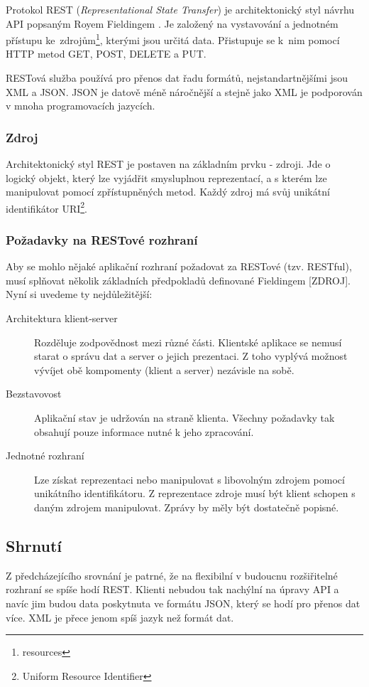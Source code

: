 \indent

Protokol REST (\textit{Representational State Transfer}) je architektonický styl návrhu API popsaným Royem Fieldingem \cite{fielding}.
Je založený na vystavování a jednotném přístupu ke~zdrojům\footnote{resources}, kterými jsou určitá data.
Přistupuje se k~nim pomocí HTTP metod GET, POST, DELETE a PUT.

\medskip

RESTová služba používá pro přenos dat řadu formátů, nejstandartnějšími jsou XML a JSON.
JSON je datově méně náročnější a stejně jako XML je podporován v mnoha programovacích jazycích.

\subsubsection*{Zdroj}

Architektonický styl REST je postaven na základním prvku - zdroji. Jde o logický objekt,
který lze vyjádřit smysluplnou reprezentací, a s kterém lze manipulovat pomocí zpřístupněných metod.
Každý zdroj má svůj unikátní identifikátor URI\footnote{Uniform Resource Identifier}.

\subsubsection*{Požadavky na RESTové rozhraní}

Aby se mohlo nějaké aplikační rozhraní požadovat za RESTové (tzv. RESTful),
musí splňovat několik základních předpokladů definované Fieldingem [ZDROJ].
Nyní si uvedeme ty nejdůležitější:

\begin{description}
    \item[Architektura klient-server]
    Rozděluje zodpovědnost mezi různé části. Klientské aplikace se nemusí starat o správu dat a server o jejich prezentaci.
    Z toho vyplývá možnost vývíjet obě kompomenty (klient a server) nezávisle na sobě.
    \item[Bezstavovost]
    Aplikační stav je udržován na straně klienta. Všechny požadavky tak obsahují pouze informace nutné k jeho zpracování.  
    \item[Jednotné rozhraní]
    Lze získat reprezentaci nebo manipulovat s libovolným zdrojem pomocí unikátního identifikátoru.
    Z reprezentace zdroje musí být klient schopen s daným zdrojem manipulovat. Zprávy by měly být dostatečně popisné.
\end{description}


\subsection{Shrnutí}

Z předcházejícího srovnání je patrné, že na flexibilní v budoucnu rozšiřitelné rozhraní se spíše hodí REST.
Klienti nebudou tak nachýlní na úpravy API a navíc jim budou data poskytnuta ve formátu JSON,
který se hodí pro přenos dat více. XML je přece jenom spíš jazyk než formát dat.
